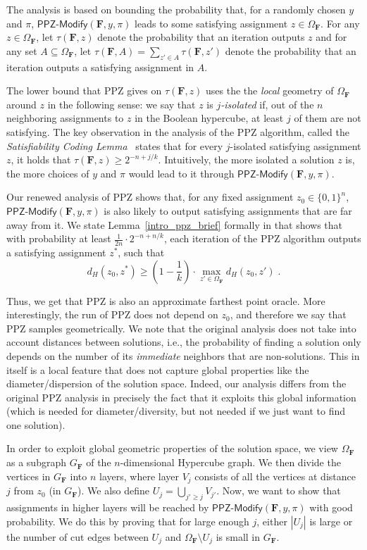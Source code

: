 \documentclass[11pt, letterpaper]{article}
\theoremstyle{definition}
\newcommand{\f}{\mathbf{F}}
\newcommand{\Om}{\Omega_{\f}}
\newcommand{\PPZMod}{\textsf{PPZ-Modify}}
\begin{document}
The analysis is based on bounding the probability that, for a randomly chosen $y$ and $\pi$,  $\PPZMod(\f,y,\pi)$ leads to some satisfying assignment $z \in \Om$. For any $z \in \Om$, let $\tau(\f,z)$ denote the probability that an iteration outputs $z$ and for any set $A \subseteq \Om$, let $\tau(\f,A)=\sum_{z' \in A} \tau(\f, z')$ denote the probability that an iteration outputs a satisfying assignment in $A$. 

The lower bound that PPZ gives on  $\tau(\f,z)$ uses the the \emph{local} geometry of $\Om$ around $z$ in the following sense: we say that $z$ is $j$\emph{-isolated} if, out of the $n$ neighboring assignments to $z$ in the Boolean hypercube, at least $j$ of them are not satisfying. The key observation in the analysis of the PPZ algorithm, called the \emph{Satisfiability Coding Lemma}~\cite{PPZ} states that for every $j$-isolated satisfying assignment $z$, it holds that $\tau(\f,z) \geq 2^{-n+j/k}$. Intuitively, the more isolated a solution $z$ is, the more choices of $y$ and $\pi$ would lead to it through  $\PPZMod(\f,y,\pi)$.


Our renewed analysis of PPZ shows that, for any fixed assignment $z_0\in \{0,1\}^n$,  $\PPZMod(\f,y,\pi)$ is also likely to output satisfying assignments that are far away from it. We state Lemma~\ref{intro_ppz_brief} formally in  that shows that with probability at least $\frac{1}{2n}\cdot 2^{-n+n/k}$, each iteration of the PPZ algorithm outputs a satisfying assignment $z^*$, such that $$d_H(z_0,z^*) \geq \left(1- \frac{1}{k}\right) \cdot \max_{z' \in \Om} d_H(z_0,z') \;.$$


Thus, we get that PPZ is also an approximate farthest point oracle. More interestingly, the run of PPZ does not depend on $z_0$, and therefore we say that PPZ samples geometrically. We note that the original analysis does not take into account distances between solutions, i.e., the probability of finding a solution only depends on the number of its \emph{immediate} neighbors that are non-solutions. This in itself is a local feature that does not capture global properties like the diameter/dispersion of the solution space. Indeed, our analysis differs 
from the original PPZ analysis in precisely the fact that it exploits this global information (which is needed for diameter/diversity, but not needed if we just want to find one solution). 


In order to exploit global geometric properties of the solution space, we view $\Om$ as a subgraph $G_{\f}$ of the $n$-dimensional Hypercube graph. We then divide the vertices in $G_\f$ into $n$ layers, where layer $V_{j}$ consists of all the vertices at distance $j$ from $z_0$ (in $G_\f$). We also define $U_{j}=\bigcup_{j' \geq j} V_{j'}$. Now, we want to show that assignments in higher layers will be reached by $\PPZMod(\f,y,\pi)$ with good probability. We do this by proving that for large enough $j$, either $|U_j|$ is large or the number of cut edges between $U_j$ and $\Om \setminus U_j$ is small in $G_\f$. 
\end{document}
